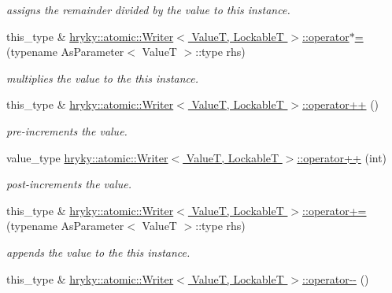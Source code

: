 \begin{DoxyCompactItemize}
\begin{DoxyCompactList}\small\item\em assigns the remainder divided by the value to this instance. \end{DoxyCompactList}\item 
\hypertarget{group__atomic__operation_ga40b0c967eb60601676828001bef4637c}{this\-\_\-type \& \hyperlink{group__atomic__operation_ga40b0c967eb60601676828001bef4637c}{hryky\-::atomic\-::\-Writer$<$ Value\-T, Lockable\-T $>$\-::operator$\ast$=} (typename As\-Parameter$<$ Value\-T $>$\-::type rhs)}\label{group__atomic__operation_ga40b0c967eb60601676828001bef4637c}

\begin{DoxyCompactList}\small\item\em multiplies the value to the this instance. \end{DoxyCompactList}\item 
\hypertarget{group__atomic__operation_ga32d8b99a3de61e36c7a0bc7aeb546a0d}{this\-\_\-type \& \hyperlink{group__atomic__operation_ga32d8b99a3de61e36c7a0bc7aeb546a0d}{hryky\-::atomic\-::\-Writer$<$ Value\-T, Lockable\-T $>$\-::operator++} ()}\label{group__atomic__operation_ga32d8b99a3de61e36c7a0bc7aeb546a0d}

\begin{DoxyCompactList}\small\item\em pre-\/increments the value. \end{DoxyCompactList}\item 
\hypertarget{group__atomic__operation_gaf9a6947db23cf27f26693b4a03030829}{value\-\_\-type \hyperlink{group__atomic__operation_gaf9a6947db23cf27f26693b4a03030829}{hryky\-::atomic\-::\-Writer$<$ Value\-T, Lockable\-T $>$\-::operator++} (int)}\label{group__atomic__operation_gaf9a6947db23cf27f26693b4a03030829}

\begin{DoxyCompactList}\small\item\em post-\/increments the value. \end{DoxyCompactList}\item 
\hypertarget{group__atomic__operation_gaa862338a2dbded8f334c6e2aa0d45e88}{this\-\_\-type \& \hyperlink{group__atomic__operation_gaa862338a2dbded8f334c6e2aa0d45e88}{hryky\-::atomic\-::\-Writer$<$ Value\-T, Lockable\-T $>$\-::operator+=} (typename As\-Parameter$<$ Value\-T $>$\-::type rhs)}\label{group__atomic__operation_gaa862338a2dbded8f334c6e2aa0d45e88}

\begin{DoxyCompactList}\small\item\em appends the value to the this instance. \end{DoxyCompactList}\item 
\hypertarget{group__atomic__operation_ga6a2f90286d2b8aef610b7ae4cef1f9e7}{this\-\_\-type \& \hyperlink{group__atomic__operation_ga6a2f90286d2b8aef610b7ae4cef1f9e7}{hryky\-::atomic\-::\-Writer$<$ Value\-T, Lockable\-T $>$\-::operator-\/-\/} ()}\label{group__atomic__operation_ga6a2f90286d2b8aef610b7ae4cef1f9e7}


\end{DoxyCompactItemize}
